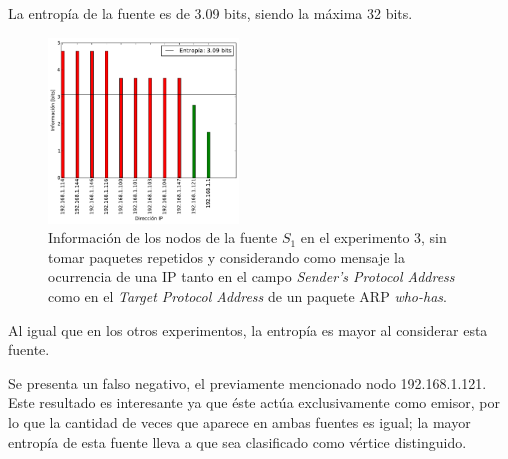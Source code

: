 \par La entropía de la fuente es de 3.09 bits, siendo la máxima 32 bits. 

\begin{figure}
    \centering
    \includegraphics[width=0.45\textwidth]{figuras/casa_figura_ambos.pdf}
    \caption{Información de los nodos de la fuente $S_1$ en el experimento 3, sin tomar paquetes repetidos y considerando como mensaje la ocurrencia de una IP tanto en el campo \textit{Sender's Protocol Address} como en el \textit{Target Protocol Address} de un paquete ARP \textit{who-has}.}
    \label{fig3A}
\end{figure}

\par Al igual que en los otros experimentos, la entropía es mayor al considerar esta fuente.

\par Se presenta un falso negativo, el previamente mencionado nodo 192.168.1.121.
Este resultado es interesante ya que éste actúa exclusivamente como emisor, por lo que la cantidad de veces que aparece en ambas fuentes es igual; la mayor entropía de esta fuente lleva a que sea clasificado como vértice distinguido.
